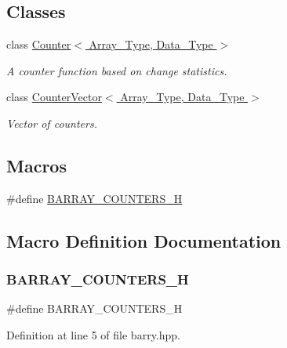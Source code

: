 \subsection*{Classes}
\begin{DoxyCompactItemize}
\item 
class \hyperlink{class_counter}{Counter$<$ Array\+\_\+\+Type, Data\+\_\+\+Type $>$}
\begin{DoxyCompactList}\small\item\em A counter function based on change statistics. \end{DoxyCompactList}\item 
class \hyperlink{class_counter_vector}{Counter\+Vector$<$ Array\+\_\+\+Type, Data\+\_\+\+Type $>$}
\begin{DoxyCompactList}\small\item\em Vector of counters. \end{DoxyCompactList}\end{DoxyCompactItemize}
\subsection*{Macros}
\begin{DoxyCompactItemize}
\item 
\#define \hyperlink{barry_8hpp_a6c60a358a2b89973d5d4b9436374ef8b}{B\+A\+R\+R\+A\+Y\+\_\+\+C\+O\+U\+N\+T\+E\+R\+S\+\_\+H}
\end{DoxyCompactItemize}


\subsection{Macro Definition Documentation}
\mbox{\label{barry_8hpp_a6c60a358a2b89973d5d4b9436374ef8b}} 
\subsubsection{\texorpdfstring{B\+A\+R\+R\+A\+Y\+\_\+\+C\+O\+U\+N\+T\+E\+R\+S\+\_\+H}{BARRAY\_COUNTERS\_H}}
{\footnotesize\ttfamily \#define B\+A\+R\+R\+A\+Y\+\_\+\+C\+O\+U\+N\+T\+E\+R\+S\+\_\+H}



Definition at line 5 of file barry.\+hpp.

